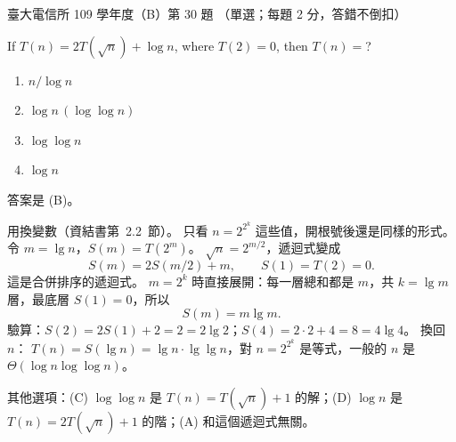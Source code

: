\begin{pastexam}[label={px:ntu-109-comm-dsa-30}]{臺大電信所 109 學年度（B）第 30 題}
（單選；每題 2 分，答錯不倒扣）

If $T(n)=2T(\sqrt{n})+\log n$, where $T(2)=0$, then $T(n)=$?
\begin{enumerate}[label=(\Alph*)]
\item $n/\log n$
\item $\log n\,(\log\log n)$
\item $\log\log n$
\item $\log n$
\end{enumerate}
\end{pastexam}

\begin{pastsoln}
答案是 (B)。

用換變數（資結書第~2.2~節）。 只看 $n = 2^{2^k}$ 這些值，開根號後還是同樣的形式。 令
$m = \lg n$，$S(m) = T(2^m)$。 $\sqrt{n} = 2^{m/2}$，遞迴式變成
\[
S(m) = 2S(m/2) + m, \qquad S(1) = T(2) = 0.
\]
這是合併排序的遞迴式。 $m = 2^k$ 時直接展開：每一層總和都是 $m$，共 $k = \lg m$ 層，最底層
$S(1) = 0$，所以
\[
S(m) = m \lg m .
\]
驗算：$S(2) = 2S(1) + 2 = 2 = 2 \lg 2$；$S(4) = 2 \cdot 2 + 4 = 8 = 4 \lg 4$。 換回 $n$：
$T(n) = S(\lg n) = \lg n \cdot \lg\lg n$，對 $n = 2^{2^k}$ 是等式，一般的 $n$ 是
$\Theta(\log n \log\log n)$。

其他選項：(C) $\log\log n$ 是 $T(n) = T(\sqrt{n}) + 1$ 的解；(D) $\log n$ 是
$T(n) = 2T(\sqrt{n}) + 1$ 的階；(A) 和這個遞迴式無關。
\end{pastsoln}
